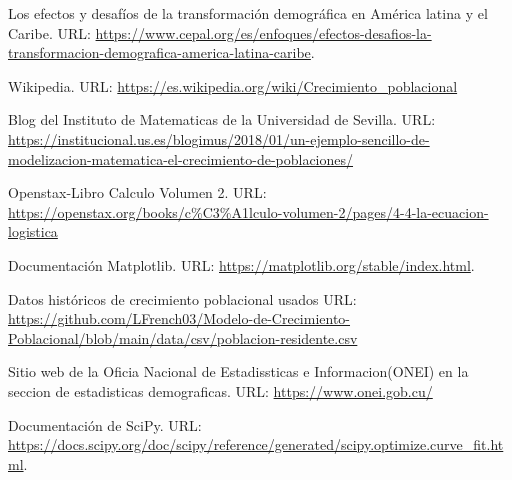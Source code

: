 \documentclass[a4paper,10pt,twocolumn]{article}
\begin{document}
\begin{thebibliography}{99}
	 Los efectos y desafíos de la transformación demográfica en América latina y el Caribe. URL: \url{https://www.cepal.org/es/enfoques/efectos-desafios-la-transformacion-demografica-america-latina-caribe}.

	 Wikipedia. URL: \url{https://es.wikipedia.org/wiki/Crecimiento_poblacional}

	 Blog del Instituto de Matematicas de la Universidad de Sevilla. URL: \url{https://institucional.us.es/blogimus/2018/01/un-ejemplo-sencillo-de-modelizacion-matematica-el-crecimiento-de-poblaciones/}

	 Openstax-Libro Calculo Volumen 2. URL: \url{https://openstax.org/books/c%C3%A1lculo-volumen-2/pages/4-4-la-ecuacion-logistica}
	
	 Documentación Matplotlib. URL: \url{https://matplotlib.org/stable/index.html}.

	 Datos históricos de crecimiento poblacional usados URL: \url{https://github.com/LFrench03/Modelo-de-Crecimiento-Poblacional/blob/main/data/csv/poblacion-residente.csv}

	 Sitio web de la Oficia Nacional de Estadissticas e Informacion(ONEI) en la seccion de
	estadisticas demograficas. URL: \url{https://www.onei.gob.cu/}

	 Documentación de SciPy. URL: \url{https://docs.scipy.org/doc/scipy/reference/generated/scipy.optimize.curve_fit.html}.

\end{thebibliography}
\end{document}
